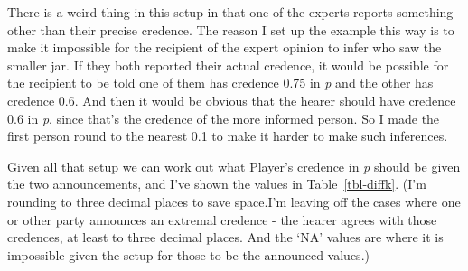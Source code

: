 \documentclass[
  10pt,
  letterpaper,
  DIV=11,
  numbers=noendperiod,
  twoside]{scrartcl}
\begin{document}
There is a weird thing in this setup in that one of the experts reports
something other than their precise credence. The reason I set up the
example this way is to make it impossible for the recipient of the
expert opinion to infer who saw the smaller jar. If they both reported
their actual credence, it would be possible for the recipient to be told
one of them has credence 0.75 in \emph{p} and the other has credence
0.6. And then it would be obvious that the hearer should have credence
0.6 in \emph{p}, since that's the credence of the more informed person.
So I made the first person round to the nearest 0.1 to make it harder to
make such inferences.

Given all that setup we can work out what Player's credence in \emph{p}
should be given the two announcements, and I've shown the values in
Table~\ref{tbl-diffk}. (I'm rounding to three decimal places to save
space.I'm leaving off the cases where one or other party announces an
extremal credence - the hearer agrees with those credences, at least to
three decimal places. And the `NA' values are where it is impossible
given the setup for those to be the announced values.)
\end{document}
